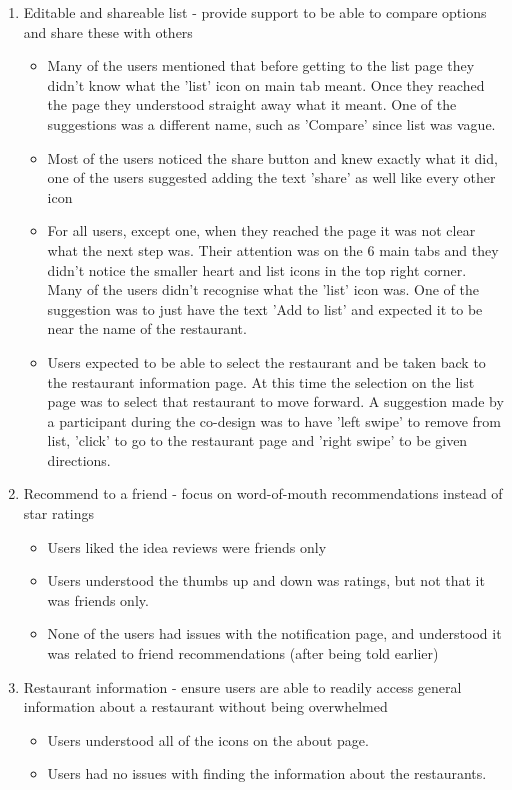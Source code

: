 \documentclass[a4 paper, 12pt]{article}
\begin{document}
\begin{enumerate}
    \item Editable and shareable list - provide support to be able to compare options and share these with others
        \begin{itemize}
            \item Many of the users mentioned that before getting to the list page they didn't know what the 'list' icon on main tab meant. Once they reached the page they understood straight away what it meant. One of the suggestions was a different name, such as 'Compare' since list was vague. 
            \item Most of the users noticed the share button and knew exactly what it did, one of the users suggested adding the text 'share' as well like every other icon
            \item For all users, except one, when they reached the page it was not clear what the next step was. Their attention was on the 6 main tabs and they didn't notice the smaller heart and list icons in the top right corner. Many of the users didn't recognise what the 'list' icon was. One of the suggestion was to just have the text 'Add to list' and expected it to be near the name of the restaurant.
            \item Users expected to be able to select the restaurant and be taken back to the restaurant information page. At this time the selection on the list page was to select that restaurant to move forward. A suggestion made by a participant during the co-design was to have 'left swipe' to remove from list, 'click' to go to the restaurant page and 'right swipe' to be given directions.
        \end{itemize}

    \item Recommend to a friend - focus on word-of-mouth recommendations instead of star ratings
        \begin{itemize}
            \item Users liked the idea reviews were friends only
            \item Users understood the thumbs up and down was ratings, but not that it was friends only.
            \item None of the users had issues with the notification page, and understood it was related to friend recommendations (after being told earlier)
        \end{itemize}

    \item Restaurant information - ensure users are able to readily access general information about a restaurant without being overwhelmed 
        \begin{itemize} 
            \item Users understood all of the icons on the about page. 
            \item Users had no issues with finding the information about the restaurants.
        \end{itemize}
\end{enumerate}
\end{document}
